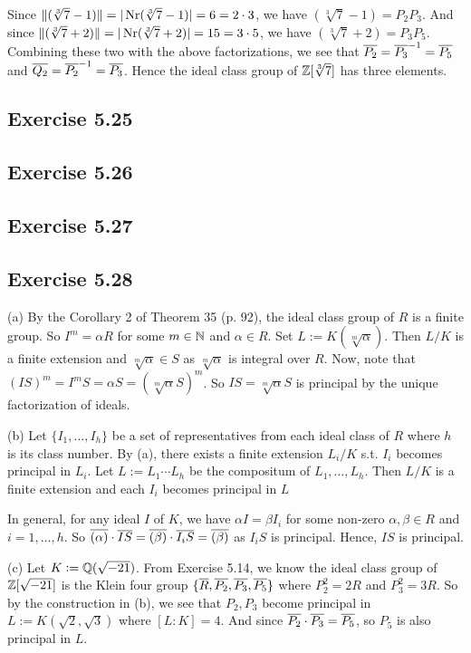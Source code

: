 \documentclass[../Marcus.tex]{subfiles}
\begin{document}
Since $\|(\sqrt[3]{7}-1)\| = |\operatorname{Nr}(\sqrt[3]{7}-1)| = 6 = 2\cdot 3$, we have $(\sqrt[3]{7}-1) = P_2P_3$. And since $\|(\sqrt[3]{7}+2)\| = |\operatorname{Nr}(\sqrt[3]{7}+2)| = 15 = 3\cdot5$, we have $(\sqrt[3]{7}+2) = P_3P_5$. Combining these two with the above factorizations, we see that $\overline{P_2} = \overline{P_3}^{-1} = \overline{P_5}$ and $\overline{Q_2} = \overline{P_2}^{-1} = \overline{P_3}$. Hence the ideal class group of $\mathbb{Z}[\sqrt[3]{7}]$ has three elements.

\subsection*{Exercise 5.25}

\subsection*{Exercise 5.26}

\subsection*{Exercise 5.27}

\subsection*{Exercise 5.28}

(a) By the Corollary 2 of Theorem 35 (p. 92), the ideal class group of $R$ is a finite group. So $I^m = \alpha R$ for some $m\in\mathbb{N}$ and $\alpha \in R$. Set $L:=K(\sqrt[m]{\alpha})$. Then $L/K$ is a finite extension and $\sqrt[m]{\alpha} \in S$ as $\sqrt[m]{\alpha}$ is integral over $R$. Now, note that $(IS)^m = I^mS = \alpha S = (\sqrt[m]{\alpha}S)^m$. So $IS = \sqrt[m]{\alpha}S$ is principal by the unique factorization of ideals.

(b) Let $\{I_1,\ldots,I_h\}$ be a set of representatives from each ideal class of $R$ where $h$ is its class number. By (a), there exists a finite extension $L_i/K$ s.t. $I_i$ becomes principal in $L_i$. Let $L := L_1\cdots L_h$ be the compositum of $L_1,\ldots,L_h$. Then $L/K$ is a finite extension and each $I_i$ becomes principal in $L$

In general, for any ideal $I$ of $K$, we have $\alpha I = \beta I_i$ for some non-zero $\alpha,\beta \in R$ and $i=1,\ldots,h$. So $\overline{(\alpha)} \cdot \overline{IS} = \overline{(\beta)} \cdot \overline{I_i S} = \overline{(\beta)}$ as $I_iS$ is principal. Hence, $IS$ is principal.

(c) Let $K:=\mathbb{Q}(\sqrt{-21})$. From Exercise 5.14, we know the ideal class group of $\mathbb{Z}[\sqrt{-21}]$ is the Klein four group $\{\overline{R},\overline{P_2},\overline{P_3},\overline{P_5}\}$ where $P_2^2=2R$ and $P_3^2=3R$. So by the construction in (b), we see that $P_2,P_3$ become principal in $L:=K(\sqrt{2},\sqrt{3})$ where $[L:K]=4$. And since $\overline{P_2}\cdot\overline{P_3} = \overline{P_5}$, so $P_5$ is also principal in $L$.
\end{document}
